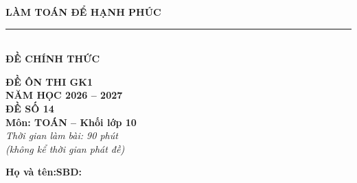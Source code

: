 \documentclass[12pt,a4paper]{article}
\begin{document}
\noindent
\begin{minipage}[c]{0.38\textwidth}
    \centering
    \textbf{LÀM TOÁN ĐỂ HẠNH PHÚC}\\[-2pt]
    \rule{3.2cm}{0.6pt}\\[4pt]
    \textbf{ĐỀ CHÍNH THỨC}
\end{minipage}\hfill
\begin{minipage}[c]{0.35\textwidth}
    \centering
    \textbf{ĐỀ ÔN THI GK1}\\
    \textbf{NĂM HỌC 2026 -- 2027}\\[2pt]
    \textbf{ĐỀ SỐ 14}\\
    \textbf{Môn: TOÁN -- Khối lớp 10}\\
    \textit{\small Thời gian làm bài: 90 phút\\(không kể thời gian phát đề)}
\end{minipage}

\vspace{0.2cm}
\noindent
\begin{minipage}[b]{0.78\textwidth}
    \textbf{Họ và tên:}\dotfill\textbf{SBD:}\makebox[3.5cm]{\dotfill}
\end{minipage}\hfill
\begin{minipage}[b]{0.20\textwidth}
    \hfill
    \setlength{\fboxrule}{0.8pt}%
\end{minipage}
\vspace{0.2cm}
\end{document}
